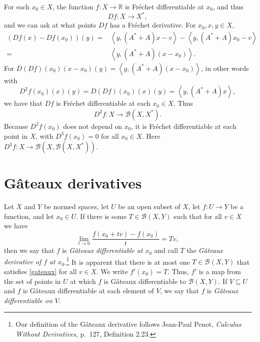 \documentclass{article}
\newcommand{\inner}[2]{\left\langle #1, #2 \right\rangle}
\theoremstyle{definition}
\theoremstyle{definition}
\begin{document}
For each $x_0 \in X$, the function $f:X \to \mathbb{R}$ is Fr\'echet differentiable at $x_0$, and thus
\[
Df:X \to X^*,
\]
and we can ask at what points $Df$ has a Fr\'echet derivative. 
For $x_0,x,y \in X$,
\begin{align*}
(Df(x)-Df(x_0))(y)=&\inner{y}{(A^*+A)x-v}-\inner{y}{(A^*+A)x_0-v}\\
=&\inner{y}{(A^*+A)(x-x_0)}.
\end{align*}
For $D(Df)(x_0)(x-x_0)(y)=\inner{y}{(A^*+A)(x-x_0)}$, in other words with
\[
D^2f(x_0)(x)(y)=D(Df)(x_0)(x)(y)=\inner{y}{(A^*+A)x},
\] 
we have that $Df$ is Fr\'echet differentiable at each $x_0 \in X$.
Thus
\[
D^2 f:X \to \mathscr{B}(X,X^*).
\]
Because $D^2 f(x_0)$ does not depend on $x_0$,  it is  Fr\'echet differentiable at each point in $X$, with
$D^3f(x_0)=0$ for all $x_0 \in X$. Here $D^3f:X \to \mathscr{B}(X,\mathscr{B}(X,X^*))$.



\section{G\^ateaux derivatives}
Let $X$ and $Y$ be normed spaces, let $U$ be an open subset of $X$, let $f:U \to Y$ be a function, and let $x_0 \in U$.
If there is some $T  \in \mathscr{B}(X,Y)$ such that for all $v \in X$ we have
\begin{equation}
\lim_{t \to 0} \frac{f(x_0+tv)-f(x_0)}{t}=T v,
\label{gateaux}
\end{equation}
then we say that $f$ is {\em G\^ateaux differentiable at $x_0$} and call $T$ the {\em G\^ateaux derivative of
$f$ at $x_0$}.\footnote{Our definition of the G\^ateaux derivative follows Jean-Paul Penot,
{\em Calculus Without Derivatives}, p.~127, Definition 2.23.} It is apparent that there is at most one
$T \in \mathscr{B}(X,Y)$ that satisfies \eqref{gateaux} for all $v \in X$. We write $f'(x_0)=T$. Thus, $f'$ is a map from the set
of points in $U$ at which $f$ is G\^ateaux differentiable to $\mathscr{B}(X,Y)$. If $V \subseteq U$ and $f$ is G\^ateaux differentiable
at each element of $V$, we say that $f$ is {\em G\^ateaux differentiable on $V$}.
\end{document}
